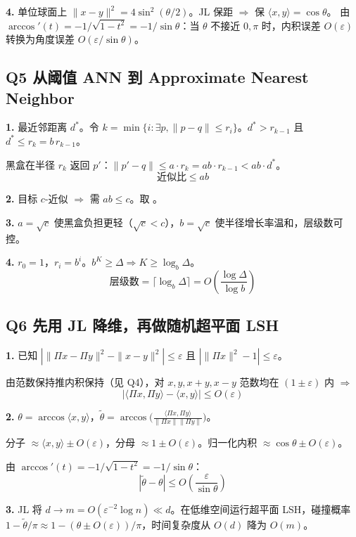 \documentclass[11pt,a4paper]{ctexart}
\newcommand{\inner}[1]{\langle #1 \rangle}
\begin{document}
\textbf{4.} 单位球面上 $\|x-y\|^2 = 4\sin^2(\theta/2)$。JL 保距 $\Rightarrow$ 保 $\inner{x,y}=\cos\theta$。
由 $\arccos'(t) = -1/\sqrt{1-t^2} = -1/\sin\theta$：当 $\theta$ 不接近 $0,\pi$ 时，内积误差 $O(\varepsilon)$ 转换为角度误差 $O(\varepsilon/\sin\theta)$。


\subsection*{Q5 \quad 从阈值 ANN 到 Approximate Nearest Neighbor}

\textbf{1.} 最近邻距离 $d^*$。令 $k = \min\{i : \exists p, \|p-q\|\leq r_i\}$。$d^* > r_{k-1}$ 且 $d^* \leq r_k = b\,r_{k-1}$。

黑盒在半径 $r_k$ 返回 $p'$：$\|p'-q\| \leq a\cdot r_k = ab\cdot r_{k-1} < ab\cdot d^*$。
\[
\boxed{\text{近似比} \leq ab}
\]

\textbf{2.} 目标 $c$-近似 $\Rightarrow$ 需 $ab \leq c$。取 。

\textbf{3.} $a=\sqrt{c}$ 使黑盒负担更轻（$\sqrt{c} < c$），$b=\sqrt{c}$ 使半径增长率温和，层级数可控。

\textbf{4.} $r_0=1$，$r_i=b^i$。$b^K \geq \Delta \Rightarrow K \geq \log_b\Delta$。
\[
\boxed{\text{层级数} = \lceil\log_b\Delta\rceil = O\!\left(\frac{\log\Delta}{\log b}\right)}
\]


\subsection*{Q6 \quad 先用 JL 降维，再做随机超平面 LSH}

\textbf{1.} 已知 $|\|\Pi x-\Pi y\|^2 - \|x-y\|^2| \leq \varepsilon$ 且 $|\|\Pi x\|^2 - 1| \leq \varepsilon$。

由范数保持推内积保持（见 Q4），对 $x,y,x+y,x-y$ 范数均在 $(1\pm\varepsilon)$ 内 $\Rightarrow$
\[
\boxed{|\inner{\Pi x,\Pi y} - \inner{x,y}| \leq O(\varepsilon)}
\]

\textbf{2.} $\theta = \arccos\inner{x,y}$，$\tilde\theta = \arccos\!\big(\frac{\inner{\Pi x,\Pi y}}{\|\Pi x\|\|\Pi y\|}\big)$。

分子 $\approx \inner{x,y} \pm O(\varepsilon)$，分母 $\approx 1 \pm O(\varepsilon)$。归一化内积 $\approx \cos\theta \pm O(\varepsilon)$。

由 $\arccos'(t) = -1/\sqrt{1-t^2} = -1/\sin\theta$：
\[
\boxed{|\tilde\theta - \theta| \leq O\!\left(\frac{\varepsilon}{\sin\theta}\right)}
\]

\textbf{3.} JL 将 $d \to m = O(\varepsilon^{-2}\log n) \ll d$。在低维空间运行超平面 LSH，碰撞概率 $1-\tilde\theta/\pi \approx 1-(\theta\pm O(\varepsilon))/\pi$，时间复杂度从 $O(d)$ 降为 $O(m)$。
\end{document}
